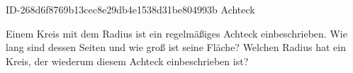 \begin{exercise}
      {ID-268d6f8769b13cec8e29db4e1538d31be804993b}
      {Achteck}
  \ifproblem\problem\par
    Einem Kreis mit dem Radius  ist ein regelmäßiges Achteck
    einbeschrieben. Wie lang sind dessen Seiten und wie groß ist seine Fläche?
    Welchen Radius hat ein Kreis, der wiederum diesem Achteck einbeschrieben
    ist?
  \fi
\end{exercise}
